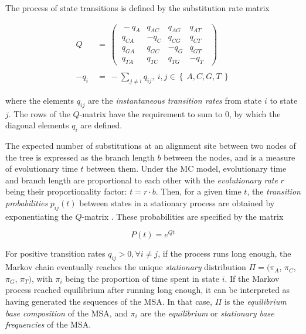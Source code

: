 The process of state transitions is defined by the substitution rate matrix %

\begin{equation}
    \begin{align*}
        Q ~&=~
         \begin{pmatrix}
         ~-q_{A}   &   q_{AC}   &   q_{AG}   &   q_{AT}~~ \\
         ~q_{CA}   &  -q_{C}    &   q_{CG}   &   q_{CT}~~ \\
         ~q_{GA}   &   q_{GC}   &  -q_{G}    &   q_{GT}~~ \\
         ~q_{TA}   &   q_{TC}   &   q_{TG}   &  -q_{T}~~
         \end{pmatrix}
        \\ \\
        - q_{i} ~&=~ - \sum_{j \neq i} q_{ij}, ~ i,j \in \left\{~ A, C, G, T ~\right\}
    \end{align*}
\end{equation}

where the elements $q_{ij}$ are the \emph{instantaneous transition rates} from state $i$ to state $j$.
The rows of the $Q$-matrix have the requirement to sum to $0$,
by which the diagonal elements $q_{i}$ are defined.

The expected number of substitutions at an alignment site between two nodes of the tree
is expressed as the branch length $b$ between the nodes, and is a measure of evolutionary time $t$ between them.
Under the MC model, evolutionary time and branch length are proportional to each other
with the \emph{evolutionary rate} $r$ being their proportionality factor: $t = r \cdot b$.
Then, for a given time $t$, the \emph{transition probabilities} $p_{ij}(t)$ between states in a stationary process
are obtained by exponentiating the $Q$-matrix \cite{Yang2014}.
These probabilities are specified by the matrix

\begin{equation}
    \label{ch:Foundations:sec:MLTreeInference:eq:P_matrix}
    P(t) = e^{Qt}
\end{equation}

For positive transition rates $q_{ij} > 0, \forall i \neq j$, if the process runs long enough,
the Markov chain eventually reaches the unique \emph{stationary} distribution $\Pi = (\pi_A$, $\pi_C$, $\pi_G$, $\pi_T )$,
with $\pi_i$ being the proportion of time spent in state $i$.
If the Markov process reached equilibrium after running long enough,
it can be interpreted as having generated the sequences of the MSA.
In that case, $\Pi$ is the \emph{equilibrium base composition} of the MSA,
and $\pi_i$ are the \emph{equilibrium} or \emph{stationary base frequencies} of the MSA.

